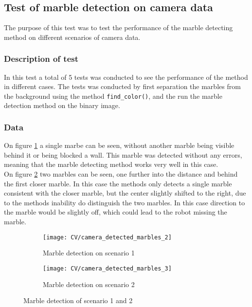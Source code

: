 \documentclass[../Head/Main.tex]{subfiles}
\begin{document}
\subsection{Test of marble detection on camera data}
\label{subsec:test_cv_marble}
The purpose of this test was to test the performance of the marble detecting method on different scenarios of camera data.
\subsubsection{Description of test}
In this test a total of 5 tests was conducted to see the performance of the method in different cases. The tests was conducted by first separation the marbles from the background using the method \texttt{find\_color()}, and the run the marble detection method on the binary image.	

\subsubsection{Data}
On figure \ref{fig:md_1} a single marbe can be seen, without another marble being visible behind it or being blocked a wall. This marble was detected without any errors, meaning that the marble detecting method works very well in this case.\\
On figure \ref{fig:md_2} two marbles can be seen, one further into the distance and behind the first closer marble. In this case the methods only detects a single marble consistent with the closer marble, but the center slightly shifted to the right, due to the methods inability do distinguish the two marbles. In this case direction to the marble would be slightly off, which could lead to the robot missing the marble.\\   
\begin{figure}[H]
	\centering
	\begin{subfigure}[b]{0.45\textwidth}
		\centering
		\texttt{[image: CV/camera\_detected\_marbles\_2]}
		\caption{Marble detection on scenario 1}
		\label{fig:md_1}
	\end{subfigure}
	\hfill
	\begin{subfigure}[b]{0.45\textwidth}
		\centering
		\texttt{[image: CV/camera\_detected\_marbles\_3]}
		\caption{Marble detection on scenario 2}
	\end{subfigure}
	\caption{Marble detection of scenario 1 and 2}
	\label{fig:md_2}
\end{figure}
\end{document}
